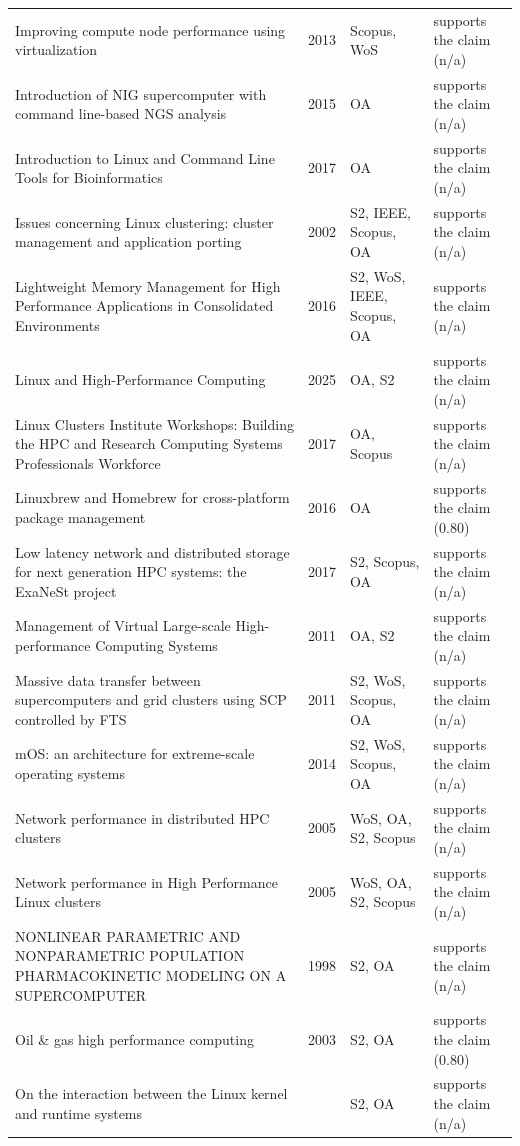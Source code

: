 \begin{longtable}{@{}%
  >{\raggedright\arraybackslash}p{}c%
  >{\raggedright\arraybackslash}p{}%
  >{\raggedright\arraybackslash}p{}@{}}
Improving compute node performance using virtualization & 2013 & Scopus, WoS & supports the claim (n/a) \\
Introduction of NIG supercomputer with command line-based NGS analysis & 2015 & OA & supports the claim (n/a) \\
Introduction to Linux and Command Line Tools for Bioinformatics & 2017 & OA & supports the claim (n/a) \\
Issues concerning Linux clustering: cluster management and application porting & 2002 & S2, IEEE, Scopus, OA & supports the claim (n/a) \\
Lightweight Memory Management for High Performance Applications in Consolidated Environments & 2016 & S2, WoS, IEEE, Scopus, OA & supports the claim (n/a) \\
Linux and High-Performance Computing & 2025 & OA, S2 & supports the claim (n/a) \\
Linux Clusters Institute Workshops: Building the HPC and Research Computing Systems Professionals Workforce & 2017 & OA, Scopus & supports the claim (n/a) \\
Linuxbrew and Homebrew for cross-platform package management & 2016 & OA & supports the claim (0.80) \\
Low latency network and distributed storage for next generation HPC systems: the ExaNeSt project & 2017 & S2, Scopus, OA & supports the claim (n/a) \\
Management of Virtual Large-scale High-performance Computing Systems & 2011 & OA, S2 & supports the claim (n/a) \\
Massive data transfer between supercomputers and grid clusters using SCP controlled by FTS & 2011 & S2, WoS, Scopus, OA & supports the claim (n/a) \\
mOS: an architecture for extreme-scale operating systems & 2014 & S2, WoS, Scopus, OA & supports the claim (n/a) \\
Network performance in distributed HPC clusters & 2005 & WoS, OA, S2, Scopus & supports the claim (n/a) \\
Network performance in High Performance Linux clusters & 2005 & WoS, OA, S2, Scopus & supports the claim (n/a) \\
NONLINEAR PARAMETRIC AND NONPARAMETRIC POPULATION PHARMACOKINETIC MODELING ON A SUPERCOMPUTER & 1998 & S2, OA & supports the claim (n/a) \\
Oil \& gas high performance computing & 2003 & S2, OA & supports the claim (0.80) \\
On the interaction between the Linux kernel and runtime systems &  & S2, OA & supports the claim (n/a) \\

\end{longtable}
